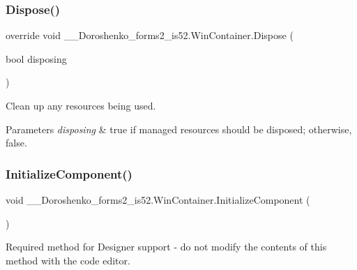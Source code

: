 \subsubsection{\texorpdfstring{Dispose()}{Dispose()}}
{\footnotesize\ttfamily override void \+\_\+\_\+\+Doroshenko\+\_\+forms2\+\_\+is52.\+Win\+Container.\+Dispose (\begin{DoxyParamCaption}\item[{bool}]{disposing }\end{DoxyParamCaption})\hspace{0.3cm}{\ttfamily [protected]}}



Clean up any resources being used. 


\begin{DoxyParams}{Parameters}
{\em disposing} & true if managed resources should be disposed; otherwise, false.\\
\hline
\end{DoxyParams}
\hypertarget{class__7___doroshenko__forms2__is52_1_1_win_container_a2273d289ead85c38898634df2eca5613}{}\label{class__7___doroshenko__forms2__is52_1_1_win_container_a2273d289ead85c38898634df2eca5613} 
\subsubsection{\texorpdfstring{Initialize\+Component()}{InitializeComponent()}}
{\footnotesize\ttfamily void \+\_\+\_\+\+Doroshenko\+\_\+forms2\+\_\+is52.\+Win\+Container.\+Initialize\+Component (\begin{DoxyParamCaption}{ }\end{DoxyParamCaption})\hspace{0.3cm}{\ttfamily [private]}}



Required method for Designer support -\/ do not modify the contents of this method with the code editor. 

